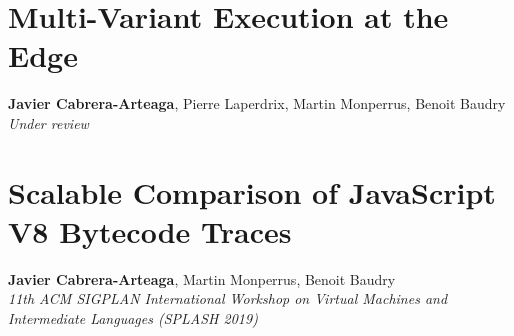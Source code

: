 %
    {} %
    {} %
    
\chapter{Multi-Variant Execution at the Edge}

\textbf{Javier Cabrera-Arteaga}, Pierre Laperdrix, Martin Monperrus, Benoit Baudry\\
\emph{Under review}\\

%
    {} %
    {} %
    
\chapter{Scalable Comparison of JavaScript V8 Bytecode Traces}

\textbf{Javier Cabrera-Arteaga}, Martin Monperrus, Benoit Baudry\\
\emph{11th ACM SIGPLAN International Workshop on Virtual Machines and Intermediate Languages (SPLASH 2019)}\\


%
    {} %
    {} %
    